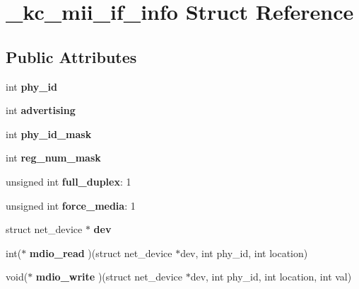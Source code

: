 \hypertarget{struct__kc__mii__if__info}{
\section{\_\-kc\_\-mii\_\-if\_\-info Struct Reference}
\label{struct__kc__mii__if__info}
}
\subsection*{Public Attributes}
\begin{DoxyCompactItemize}
\item 
\hypertarget{struct__kc__mii__if__info_a0838da87adfcc3afc6a35e5e91606472}{
int {\bfseries phy\_\-id}}
\label{struct__kc__mii__if__info_a0838da87adfcc3afc6a35e5e91606472}

\item 
\hypertarget{struct__kc__mii__if__info_a63e3925cf3cd6e4888ba532ad5f8056b}{
int {\bfseries advertising}}
\label{struct__kc__mii__if__info_a63e3925cf3cd6e4888ba532ad5f8056b}

\item 
\hypertarget{struct__kc__mii__if__info_a235af917a3d7fe29f0544cfe2d5586b3}{
int {\bfseries phy\_\-id\_\-mask}}
\label{struct__kc__mii__if__info_a235af917a3d7fe29f0544cfe2d5586b3}

\item 
\hypertarget{struct__kc__mii__if__info_a30eeda9f6839fb1a11328e478a647b38}{
int {\bfseries reg\_\-num\_\-mask}}
\label{struct__kc__mii__if__info_a30eeda9f6839fb1a11328e478a647b38}

\item 
\hypertarget{struct__kc__mii__if__info_a75e983e3191d0637d4b7c8e613a671f2}{
unsigned int {\bfseries full\_\-duplex}: 1}
\label{struct__kc__mii__if__info_a75e983e3191d0637d4b7c8e613a671f2}

\item 
\hypertarget{struct__kc__mii__if__info_a6753e207c1560a1cafe9662949f5e317}{
unsigned int {\bfseries force\_\-media}: 1}
\label{struct__kc__mii__if__info_a6753e207c1560a1cafe9662949f5e317}

\item 
\hypertarget{struct__kc__mii__if__info_a138dc2436ef9f59bfb39c673c36cda86}{
struct net\_\-device $\ast$ {\bfseries dev}}
\label{struct__kc__mii__if__info_a138dc2436ef9f59bfb39c673c36cda86}

\item 
\hypertarget{struct__kc__mii__if__info_a312ccf37afd94eb0ec45d8aff979258a}{
int($\ast$ {\bfseries mdio\_\-read} )(struct net\_\-device $\ast$dev, int phy\_\-id, int location)}
\label{struct__kc__mii__if__info_a312ccf37afd94eb0ec45d8aff979258a}

\item 
\hypertarget{struct__kc__mii__if__info_aa6bef7feccb1b9319cf517a011a5058d}{
void($\ast$ {\bfseries mdio\_\-write} )(struct net\_\-device $\ast$dev, int phy\_\-id, int location, int val)}
\label{struct__kc__mii__if__info_aa6bef7feccb1b9319cf517a011a5058d}

\end{DoxyCompactItemize}


